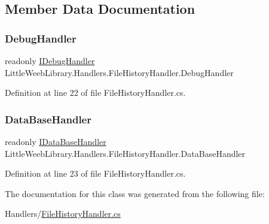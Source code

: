 \subsection{Member Data Documentation}
\mbox{\label{class_little_weeb_library_1_1_handlers_1_1_file_history_handler_afeb86d3ea5c145f7dd6937f061679395}} 
\subsubsection{\texorpdfstring{Debug\+Handler}{DebugHandler}}
{\footnotesize\ttfamily readonly \mbox{\hyperlink{interface_little_weeb_library_1_1_handlers_1_1_i_debug_handler}{I\+Debug\+Handler}} Little\+Weeb\+Library.\+Handlers.\+File\+History\+Handler.\+Debug\+Handler\hspace{0.3cm}{\ttfamily [private]}}



Definition at line 22 of file File\+History\+Handler.\+cs.

\mbox{\label{class_little_weeb_library_1_1_handlers_1_1_file_history_handler_afe186c8ea770ecb9253a07f82f23c471}} 
\subsubsection{\texorpdfstring{Data\+Base\+Handler}{DataBaseHandler}}
{\footnotesize\ttfamily readonly \mbox{\hyperlink{interface_little_weeb_library_1_1_handlers_1_1_i_data_base_handler}{I\+Data\+Base\+Handler}} Little\+Weeb\+Library.\+Handlers.\+File\+History\+Handler.\+Data\+Base\+Handler\hspace{0.3cm}{\ttfamily [private]}}



Definition at line 23 of file File\+History\+Handler.\+cs.



The documentation for this class was generated from the following file\+:\begin{DoxyCompactItemize}
\item 
Handlers/\mbox{\hyperlink{_file_history_handler_8cs}{File\+History\+Handler.\+cs}}\end{DoxyCompactItemize}
